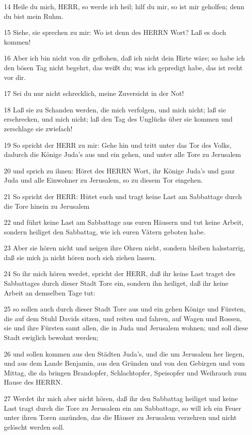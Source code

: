 \par 14 Heile du mich, HERR, so werde ich heil; hilf du mir, so ist mir geholfen; denn du bist mein Ruhm.
\par 15 Siehe, sie sprechen zu mir: Wo ist denn des HERRN Wort? Laß es doch kommen!
\par 16 Aber ich bin nicht von dir geflohen, daß ich nicht dein Hirte wäre; so habe ich den bösen Tag nicht begehrt, das weißt du; was ich gepredigt habe, das ist recht vor dir.
\par 17 Sei du nur nicht schrecklich, meine Zuversicht in der Not!
\par 18 Laß sie zu Schanden werden, die mich verfolgen, und mich nicht; laß sie erschrecken, und mich nicht; laß den Tag des Unglücks über sie kommen und zerschlage sie zwiefach!
\par 19 So spricht der HERR zu mir: Gehe hin und tritt unter das Tor des Volks, dadurch die Könige Juda's aus und ein gehen, und unter alle Tore zu Jerusalem
\par 20 und sprich zu ihnen: Höret des HERRN Wort, ihr Könige Juda's und ganz Juda und alle Einwohner zu Jerusalem, so zu diesem Tor eingehen.
\par 21 So spricht der HERR: Hütet euch und tragt keine Last am Sabbattage durch die Tore hinein zu Jerusalem
\par 22 und führt keine Last am Sabbattage aus euren Häusern und tut keine Arbeit, sondern heiliget den Sabbattag, wie ich euren Vätern geboten habe.
\par 23 Aber sie hören nicht und neigen ihre Ohren nicht, sondern bleiben halsstarrig, daß sie mich ja nicht hören noch sich ziehen lassen.
\par 24 So ihr mich hören werdet, spricht der HERR, daß ihr keine Last traget des Sabbattages durch dieser Stadt Tore ein, sondern ihn heiliget, daß ihr keine Arbeit an demselben Tage tut:
\par 25 so sollen auch durch dieser Stadt Tore aus und ein gehen Könige und Fürsten, die auf dem Stuhl Davids sitzen, und reiten und fahren, auf Wagen und Rossen, sie und ihre Fürsten samt allen, die in Juda und Jerusalem wohnen; und soll diese Stadt ewiglich bewohnt werden;
\par 26 und sollen kommen aus den Städten Juda's, und die um Jerusalem her liegen, und aus dem Lande Benjamin, aus den Gründen und von den Gebirgen und vom Mittag, die da bringen Brandopfer, Schlachtopfer, Speisopfer und Weihrauch zum Hause des HERRN.
\par 27 Werdet ihr mich aber nicht hören, daß ihr den Sabbattag heiliget und keine Last tragt durch die Tore zu Jerusalem ein am Sabbattage, so will ich ein Feuer unter ihren Toren anzünden, das die Häuser zu Jerusalem verzehren und nicht gelöscht werden soll.

